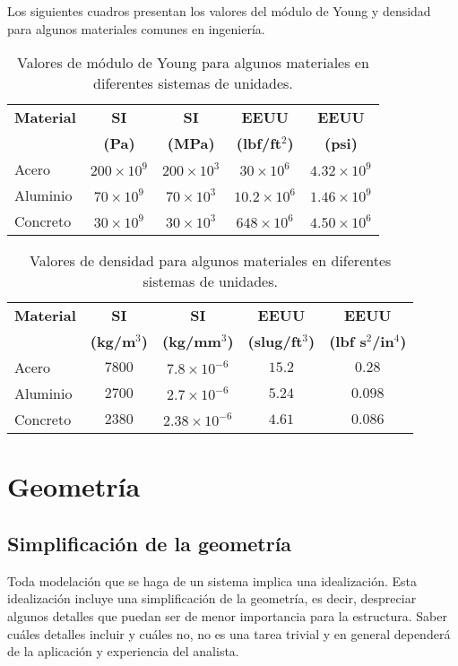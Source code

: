Los siguientes cuadros presentan los valores del módulo de Young y densidad para algunos materiales comunes en ingeniería.
\begin{table}[h]
\centering
\begin{tabular}{lcccc}
\hline 
\textbf{Material} & \textbf{SI}  & \textbf{SI} & \textbf{EEUU} & \textbf{EEUU} \\
   & \textbf{(Pa)}  & \textbf{(MPa)} & \textbf{(lbf/ft$^2$)} & \textbf{(psi)} \\ 
\hline
Acero   &$200\times 10^9$ &$200\times 10^3$ &$30\times 10^6$ &$4.32\times 10^9$\\
Aluminio &$70\times 10^9$ &$70 \times 10^3$ &$10.2 \times 10^6$ &$1.46 \times 10^9$\\
Concreto & $30\times 10^9$ &$30\times 10^3$ &$648\times 10^6$ &$4.50\times 10^6$\\
\hline 
\end{tabular}
\caption{Valores de módulo de Young para algunos materiales en diferentes sistemas de unidades.}
\end{table}
\begin{table}[h]
\centering
\begin{tabular}{lcccc}
\hline 
\textbf{Material} & \textbf{SI}  & \textbf{SI} & \textbf{EEUU} & \textbf{EEUU} \\
 & \textbf{(kg/m$^3$)}  & \textbf{(kg/mm$^3$)} & \textbf{(slug/ft$^3$)} & \textbf{(lbf s$^2$/in$^4$)} \\ 
\hline
Acero   &$7800$ &$7.8 \times 10^{-6}$ &$15.2$ &$0.28$\\
Aluminio &$2700$ &$2.7 \times 10^{-6}$ &$5.24$ &$0.098$\\
Concreto & $2380$ &$2.38 \times 10^{-6}$ &$4.61$ &$0.086$\\
\hline 
\end{tabular}
\caption{Valores de densidad para algunos materiales en diferentes sistemas de unidades.}
\end{table}



\section{Geometría}

\subsection{Simplificación de la geometría}
Toda modelación que se haga de un sistema implica una idealización. Esta idealización incluye una simplificación de la geometría, es decir, despreciar algunos detalles que puedan ser de menor importancia para la estructura. Saber cuáles detalles incluir y cuáles no, no es una tarea trivial y en general dependerá de la aplicación y experiencia del analista.

